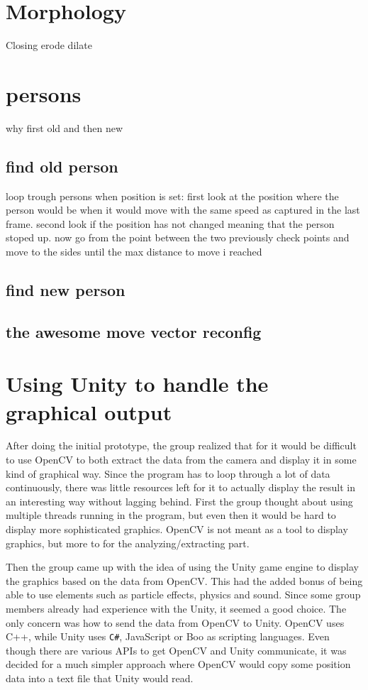\section{Morphology}
Closing
	erode
	dilate
	
\section{persons}
why first old and then new
\subsection{find old person}
loop trough persons
when position is set:
	first look at the position where the person would be when it would move with the same speed as captured in the last frame.
	second look if the position has not changed meaning that the person stoped up.
	now go from the point between the two previously check points and move to the sides until the max distance to move i reached
	
\subsection{find new person}

\subsection{the awesome move vector reconfig}

\section{Using Unity to handle the graphical output}
After doing the initial prototype, the group realized that for it would be difficult to use OpenCV to both extract the data from the camera and display it in some kind of graphical way. Since the program has to loop through a lot of data continuously, there was little resources left for it to actually display the result in an interesting way without lagging behind. First the group thought about using multiple threads running in the program, but even then it would be hard to display more sophisticated graphics. OpenCV is not meant as a tool to display graphics, but more to for the analyzing/extracting part.

Then the group came up with the idea of using the Unity game engine to display the graphics based on the data from OpenCV. This had the added bonus of being able to use elements such as particle effects, physics and sound. Since some group members already had experience with the Unity, it seemed a good choice. The only concern was how to send the data from OpenCV to Unity. OpenCV uses C++, while Unity uses \texttt{C\#}, JavaScript or Boo as scripting languages. Even though there are various APIs to get OpenCV and Unity communicate, it was decided for a much simpler approach where OpenCV would copy some position data into a text file that Unity would read.


